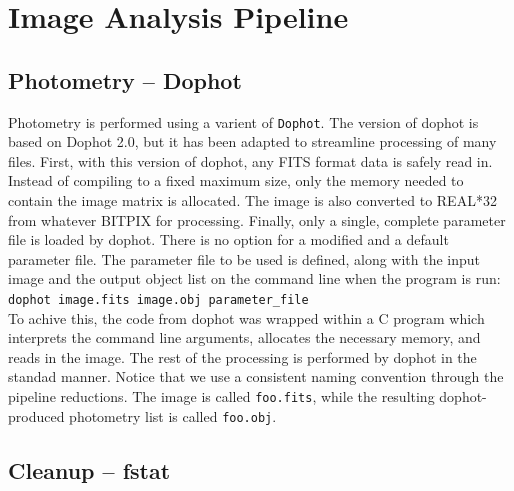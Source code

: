 \documentclass{article}
\begin{document}
\section{Image Analysis Pipeline}
\label{parallel}
\subsection{Photometry -- Dophot}

Photometry is performed using a varient of {\tt Dophot}.  The version
of dophot is based on Dophot 2.0, but it has been adapted to
streamline processing of many files.  First, with this version of
dophot, any FITS format data is safely read in.  Instead of compiling
to a fixed maximum size, only the memory needed to contain the image
matrix is allocated.  The image is also converted to REAL*32 from
whatever BITPIX for processing.  Finally, only a single, complete
parameter file is loaded by dophot.  There is no option for a modified
and a default parameter file.  The parameter file to be used is
defined, along with the input image and the output object list on the
command line when the program is run: \\
{\tt dophot image.fits image.obj parameter\_file} \\
To achive this, the code from dophot was wrapped within a C program
which interprets the command line arguments, allocates the necessary
memory, and reads in the image.  The rest of the processing is
performed by dophot in the standad manner.  Notice that we use a
consistent naming convention through the pipeline reductions.  The
image is called {\tt foo.fits}, while the resulting dophot-produced
photometry list is called {\tt foo.obj}.  

\subsection{Cleanup -- fstat}
\end{document}
